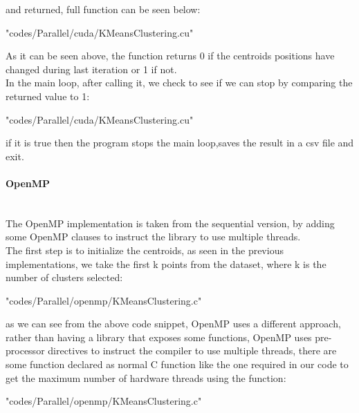 \documentclass[10pt,twocolumn,letterpaper]{article}
\newcommand{\nlparagraph}[1]{\paragraph{#1}\mbox{}\\}
\begin{document}
and returned, full function can be seen below:\\
\begin{lstinputlisting}[language=C,style=CSnippetStyle,caption=CUDA Exit Condition Kernel Launcher,firstline=116,lastline=131]{
	"codes/Parallel/cuda/KMeansClustering.cu"}
\end{lstinputlisting}
As it can be seen above, the function returns 0 if the centroids positions have changed during last iteration or 1 if not.\\
In the main loop, after calling it, we check to see if we can stop by comparing the returned value to 1:\\
\begin{lstinputlisting}[language=C,style=CSnippetStyle,caption=CUDA Exit Condition,firstline=290,lastline=293]{
	"codes/Parallel/cuda/KMeansClustering.cu"}
\end{lstinputlisting}
if it is true then the program stops the main loop,saves the result in a csv file and exit.\\
\nlparagraph{OpenMP}
The OpenMP implementation is taken from the sequential version, by adding some OpenMP clauses to instruct the library to use
multiple threads.\\
The first step is to initialize the centroids, as seen in the previous implementations, we take the first k points from the 
dataset, where k is the number of clusters selected:\\

\begin{lstinputlisting}[language=C,style=CSnippetStyle,caption=OpenMP Centroid Initialization,firstline=19,lastline=24]{
	"codes/Parallel/openmp/KMeansClustering.c"}
\end{lstinputlisting}

as we can see from the above code snippet, OpenMP uses a different approach, rather than having a library that exposes some 
functions, OpenMP uses pre-processor directives to instruct the compiler to use multiple threads, there are some function 
declared as normal C function like the one required in our code to get the maximum number of hardware threads using the 
function:\\

\begin{lstinputlisting}[language=C,style=CSnippetStyle,caption=OpenMP Get Max Number of Threads Function,firstline=17,lastline=17]{"codes/Parallel/openmp/KMeansClustering.c"}
\end{lstinputlisting}
\end{document}
